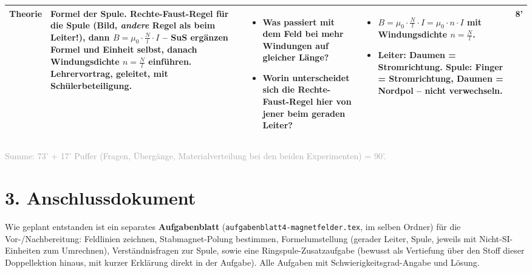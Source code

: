 \documentclass[11pt,a4paper]{article}
\newcommand{\Methode}[1]{{\small\color{groupteal}\textbf{#1}}}
\begin{document}
\begin{xltabular}{\textwidth}{@{}Y{2.1cm} Y{6.6cm} Y{6.6cm} Y{6.6cm} p{1.1cm}@{}}
Theorie &
\textbf{Formel der Spule.} Rechte-Faust-Regel für die Spule (Bild,
\emph{andere} Regel als beim Leiter!), dann
$B=\mu_0\cdot\frac{N}{l}\cdot I$ -- SuS ergänzen Formel und Einheit selbst,
danach Windungsdichte $n=\frac{N}{l}$ einführen.
\Methode{Lehrervortrag, geleitet, mit Schülerbeteiligung}. &
\begin{itemize}
  \item Was passiert mit dem Feld bei mehr Windungen auf gleicher Länge?
  \item Worin unterscheidet sich die Rechte-Faust-Regel hier von jener
  beim geraden Leiter?
\end{itemize} &
\begin{itemize}
  \item $B=\mu_0\cdot\frac{N}{l}\cdot I=\mu_0\cdot n\cdot I$ mit
  Windungsdichte $n=\frac{N}{l}$.
  \item Leiter: Daumen = Stromrichtung. Spule: Finger = Stromrichtung,
  Daumen = Nordpol -- nicht verwechseln.
\end{itemize} &
8' \\
\bottomrule
\end{xltabular}

\textcolor{darkgray}{\small Summe: 73' + 17' Puffer (Fragen, Übergänge,
Materialverteilung bei den beiden Experimenten) = 90'.}

\section*{3. Anschlussdokument}

Wie geplant entstanden ist ein separates \textbf{Aufgabenblatt}
(\texttt{aufgabenblatt4-magnetfelder.tex}, im selben Ordner) für die
Vor-/Nachbereitung: Feldlinien zeichnen, Stabmagnet-Polung bestimmen,
Formelumstellung (gerader Leiter, Spule, jeweils mit Nicht-SI-Einheiten zum
Umrechnen), Verständnisfragen zur Spule, sowie eine Ringspule-Zusatzaufgabe
(bewusst als Vertiefung über den Stoff dieser Doppellektion hinaus, mit
kurzer Erklärung direkt in der Aufgabe). Alle Aufgaben mit
Schwierigkeitsgrad-Angabe und Lösung.
\end{document}
